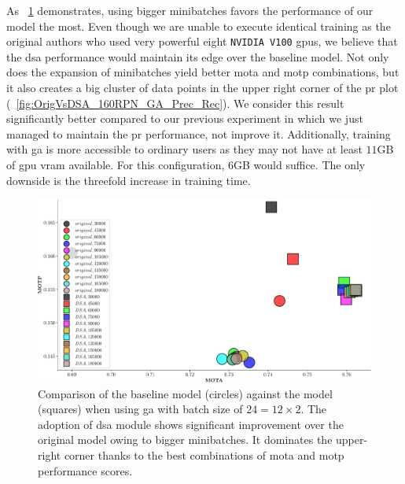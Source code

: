 As \figtext{}~\ref{fig:OrigVsDSA_160RPN_GA_MOTA_MOTP} demonstrates, using bigger minibatches favors the performance of our model the most. Even though we are unable to execute identical training as the original authors who used very powerful eight \texttt{NVIDIA V100} \glspl{gpu}, we believe that the \gls{dsa} performance would maintain its edge over the baseline model. Not only does the expansion of minibatches yield better \gls{mota} and \gls{motp} combinations, but it also creates a big cluster of data points in the upper right corner of the \gls{pr} plot (\figtext{}~\ref{fig:OrigVsDSA_160RPN_GA_Prec_Rec}). We consider this result significantly better compared to our previous experiment in which we just managed to maintain the \gls{pr} performance, not improve it. Additionally, training with \gls{ga} is more accessible to ordinary users as they may not have at least $11$GB of \gls{gpu} \gls{vram} available. For this configuration, $6$GB would suffice. The only downside is the threefold increase in training time.

\begin{figure}[t]
  \centerline{\includegraphics[width=\linewidth]{figures/siamese_tracking/tracker_cmp_160_2x12_vs_160_2x2_DSA_GA_MOTA_MOTP.pdf}}
  \caption[\gls{dsa} evaluation with \gls{ga} - primary metrics]{Comparison of the baseline model (circles) against the \dsamodel{} model (squares) when using \gls{ga} with batch size of $24 = 12 \times 2$. The adoption of \gls{dsa} module shows significant improvement over the original model owing to bigger minibatches. It dominates the upper-right corner thanks to the best combinations of \gls{mota} and \gls{motp} performance scores.}
  \label{fig:OrigVsDSA_160RPN_GA_MOTA_MOTP}
\end{figure}

